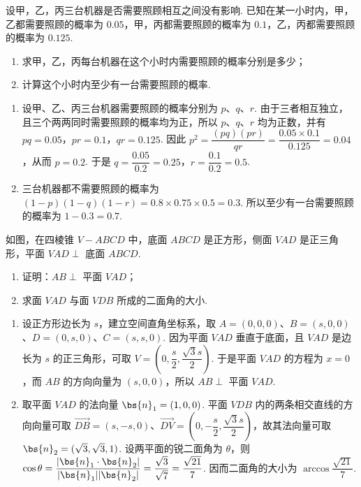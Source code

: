 \begin{problem}
设甲，乙，丙三台机器是否需要照顾相互之间没有影响. 已知在某一小时内，甲，乙都需要照顾的概率为 \(0.05\)，甲，丙都需要照顾的概率为 \(0.1\)，乙，丙都需要照顾的概率为 \(0.125\).

\begin{enumerate}
\item 求甲，乙，丙每台机器在这个小时内需要照顾的概率分别是多少；
\item 计算这个小时内至少有一台需要照顾的概率.
\end{enumerate}
\end{problem}

\begin{solution}
\begin{enumerate}
\item 设甲、乙、丙三台机器需要照顾的概率分别为 \(p\)、\(q\)、\(r\). 由于三者相互独立，且三个两两同时需要照顾的概率均为正，所以 \(p\)、\(q\)、\(r\) 均为正数，并有 \(pq=0.05\)，\(pr=0.1\)，\(qr=0.125\). 因此
\(p^2=\dfrac{(pq)(pr)}{qr}=\dfrac{0.05\times0.1}{0.125}=0.04\)，从而 \(p=0.2\). 于是 \(q=\dfrac{0.05}{0.2}=0.25\)，\(r=\dfrac{0.1}{0.2}=0.5\).
\item 三台机器都不需要照顾的概率为 \((1-p)(1-q)(1-r)=0.8\times0.75\times0.5=0.3\). 所以至少有一台需要照顾的概率为 \(1-0.3=0.7\).
\end{enumerate}
\end{solution}


\begin{problem}
如图，在四棱锥 \(V - ABCD\) 中，底面 \(ABCD\) 是正方形，侧面 \(VAD\) 是正三角形，平面 \(VAD \perp\) 底面 \(ABCD\).

\begin{enumerate}
\item 证明：\(AB \perp\) 平面 \(VAD\)；
\item 求面 \(VAD\) 与面 \(VDB\) 所成的二面角的大小.
\end{enumerate}


\end{problem}

\begin{solution}
\begin{enumerate}
\item 设正方形边长为 \(s\)，建立空间直角坐标系，取 \(A=(0,0,0)\)、\(B=(s,0,0)\)、\(D=(0,s,0)\)、\(C=(s,s,0)\). 因为平面 \(VAD\) 垂直于底面，且 \(VAD\) 是边长为 \(s\) 的正三角形，可取 \(V=\left(0,\dfrac{s}{2},\dfrac{\sqrt3s}{2}\right)\). 于是平面 \(VAD\) 的方程为 \(x=0\)，而 \(AB\) 的方向向量为 \((s,0,0)\)，所以 \(AB\perp\) 平面 \(VAD\).
\item 取平面 \(VAD\) 的法向量 \(\bs{n}_1=(1,0,0)\). 平面 \(VDB\) 内的两条相交直线的方向向量可取 \(\overrightarrow{DB}=(s,-s,0)\)、\(\overrightarrow{DV}=\left(0,-\dfrac{s}{2},\dfrac{\sqrt3s}{2}\right)\)，故其法向量可取 \(\bs{n}_2=(\sqrt3,\sqrt3,1)\). 设两平面的锐二面角为 \(\theta\)，则
\(\cos\theta=\dfrac{\lvert\bs{n}_1\cdot\bs{n}_2\rvert}{\lvert\bs{n}_1\rvert\lvert\bs{n}_2\rvert}=\dfrac{\sqrt3}{\sqrt7}=\dfrac{\sqrt{21}}{7}\). 因而二面角的大小为 \(\arccos\dfrac{\sqrt{21}}{7}\).
\end{enumerate}
\end{solution}


